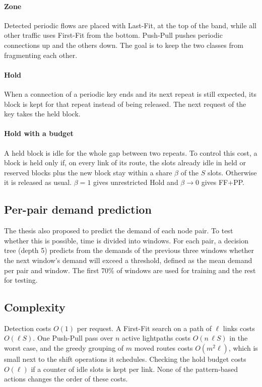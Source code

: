 \documentclass[preprint,12pt]{elsarticle}
\begin{document}
\paragraph{Zone} Detected periodic flows are placed with Last-Fit, at the top of the band, while all other traffic uses First-Fit from the bottom. Push-Pull pushes periodic connections up and the others down. The goal is to keep the two classes from fragmenting each other.

\paragraph{Hold} When a connection of a periodic key ends and its next repeat is still expected, its block is kept for that repeat instead of being released. The next request of the key takes the held block.

\paragraph{Hold with a budget} A held block is idle for the whole gap between two repeats. To control this cost, a block is held only if, on every link of its route, the slots already idle in held or reserved blocks plus the new block stay within a share $\beta$ of the $S$ slots. Otherwise it is released as usual. $\beta=1$ gives unrestricted Hold and $\beta\to 0$ gives FF+PP.

\subsection{Per-pair demand prediction}
The thesis \cite{malayeri2022} also proposed to predict the demand of each node pair. To test whether this is possible, time is divided into windows. For each pair, a decision tree (depth 5) predicts from the demands of the previous three windows whether the next window's demand will exceed a threshold, defined as the mean demand per pair and window. The first 70\% of windows are used for training and the rest for testing.

\subsection{Complexity}
Detection costs $O(1)$ per request. A First-Fit search on a path of $\ell$ links costs $O(\ell S)$. One Push-Pull pass over $n$ active lightpaths costs $O(n\,\ell S)$ in the worst case, and the greedy grouping of $m$ moved routes costs $O(m^2\ell)$, which is small next to the shift operations it schedules. Checking the hold budget costs $O(\ell)$ if a counter of idle slots is kept per link. None of the pattern-based actions changes the order of these costs.
\end{document}
